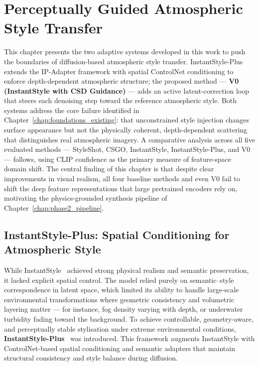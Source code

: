 \chapter{Perceptually Guided Atmospheric Style Transfer}
\label{chap:adaptive_proposed}

This chapter presents the two adaptive systems developed in this work to push the boundaries of diffusion-based atmospheric style transfer.
InstantStyle-Plus extends the IP-Adapter framework with spatial ControlNet conditioning to enforce depth-dependent atmospheric structure; the proposed method --- \textbf{V0 (InstantStyle with CSD Guidance)} --- adds an active latent-correction loop that steers each denoising step toward the reference atmospheric style.
Both systems address the core failure identified in Chapter~\ref{chap:foundations_existing}: that unconstrained style injection changes surface appearance but not the physically coherent, depth-dependent scattering that distinguishes real atmospheric imagery.
A comparative analysis across all five evaluated methods --- StyleShot, CSGO, InstantStyle, InstantStyle-Plus, and V0 --- follows, using CLIP confidence as the primary measure of feature-space domain shift.
The central finding of this chapter is that despite clear improvements in visual realism, all four baseline methods and even V0 fail to shift the deep feature representations that large pretrained encoders rely on, motivating the physics-grounded synthesis pipeline of Chapter~\ref{chap:phase2_pipeline}.

\section{InstantStyle-Plus: Spatial Conditioning for Atmospheric Style}
\label{sec:instantstyleplus}

\noindent
While InstantStyle~\cite{wang2024instantstyle} achieved strong physical realism and semantic preservation, it lacked explicit spatial control.
The model relied purely on semantic--style correspondence in latent space, which limited its ability to handle large-scale environmental transformations where geometric consistency and volumetric layering matter --- for instance, fog density varying with depth, or underwater turbidity fading toward the background.
To achieve controllable, geometry-aware, and perceptually stable stylisation under extreme environmental conditions, \textbf{InstantStyle-Plus}~\cite{wang2024instantstyleplus} was introduced.
This framework augments InstantStyle with ControlNet-based spatial conditioning and semantic adapters that maintain structural consistency and style balance during diffusion.


